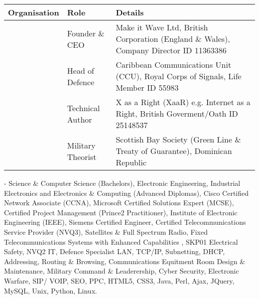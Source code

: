 \documentclass[letterpaper,10pt,openany,oneside,english]{sphinxmanual}
\begin{document}
\begin{savenotes}\sphinxattablestart
\centering
\begin{tabulary}{\linewidth}[t]{|T|T|T|}
\hline
\sphinxstyletheadfamily 
Organisation
&\sphinxstyletheadfamily 
Role
&\sphinxstyletheadfamily 
Details
\\
\hline
\noindent{}
&
Founder \& CEO
&
Make it Wave Ltd, British Corporation (England \& Wales), Company Director ID 11363386
\\
\hline
\noindent{}
&
Head of Defence
&
Caribbean Communications Unit (CCU), Royal Corps of Signals, Life Member ID 55983
\\
\hline
\noindent{}
&
Technical Author
&
X as a Right (XaaR) e.g. Internet as a Right, British Goverment/Oath ID 25148537
\\
\hline
\noindent{}
&
Military Theorist
&
Scottish Bay Society (Green Line \& Treaty of Guarantee), Dominican Republic
\\
\hline
\end{tabulary}
\par
\sphinxattableend\end{savenotes}

 - Science \& Computer Science (Bachelors), Electronic Engineering, Industrial Electronics and Electronics \& Computing (Advanced Diplomas), Cisco Certified Network Associate (CCNA), Microsoft Certified Solutions Expert (MCSE), Certified Project Management (Prince2 Practitioner), Institute of Electronic Engineering (IEEE), Siemens Certified Engineer, Certified Telecommunications Service Provider (NVQ3), Satellites \& Full Spectrum Radio, Fixed Telecommunications Systems with Enhanced Capabilities , SKP01 Electrical Safety, NVQ2 IT, Defence Specialist LAN, TCP/IP, Subnetting, DHCP, Addressing, Routing \& Browsing, Communications Equitment Room Design \& Maintenance, Military Command \& Leaderership,  Cyber Security, Electronic Warfare, SIP/ VOIP, SEO, PPC, HTML5, CSS3, Java, Perl, Ajax, JQuery, MySQL, Unix, Python, Linux.



\renewcommand{\indexname}{Index}
\printindex
\end{document}
